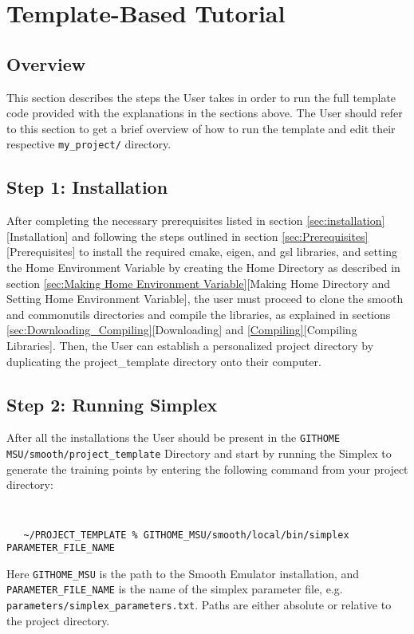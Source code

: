 \documentclass[main.tex]{subfiles}
\begin{document}
\setcounter{section}{6}
\section{Template-Based Tutorial}\label{sec:tutorial}

\subsection{Overview}
This section describes the steps the User takes in order to run the full template code provided with the explanations in the sections above. The User should refer to this section to get a brief overview of how to run the template and edit their respective {\tt my\_project/} directory.

\subsection{Step 1: Installation}
After completing the necessary prerequisites listed in section \ref{sec:installation}[Installation] and following the steps outlined in section \ref{sec:Prerequisites}[Prerequisites] to install the required cmake, eigen, and gsl libraries, and setting the Home Environment Variable by creating the Home Directory as described in section \ref{sec:Making Home Environment Variable}[Making Home Directory and Setting Home Environment Variable], the user must proceed to clone the smooth and commonutils directories and compile the libraries, as explained in sections \ref{sec:Downloading_Compiling}[Downloading] and \ref{Compiling}[Compiling Libraries]. Then, the User can establish a personalized project directory by duplicating the project\_template directory onto their computer.

\subsection{Step 2: Running Simplex}

After all the installations the User should be present in the  {\tt GITHOME MSU/smooth/project\_template} Directory and start by running the Simplex to generate the training points by entering the following command from your project directory:
{\tt
\begin{verbatim}
   ~/PROJECT_TEMPLATE % GITHOME_MSU/smooth/local/bin/simplex PARAMETER_FILE_NAME
\end{verbatim}
}
Here {\tt GITHOME\_MSU} is the path to the Smooth Emulator installation, and {\tt PARAMETER\_FILE\_NAME} is the name of the simplex parameter file, e.g. {\tt parameters/simplex\_parameters.txt}. Paths are either absolute or relative to the project directory.
\end{document}
